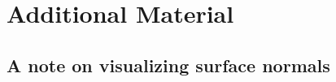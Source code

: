 \chapter{Additional Material}
\label{app:additional}

\section{A note on visualizing surface normals}

